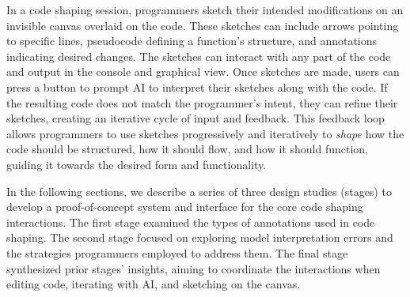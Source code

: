 In a code shaping session, programmers sketch their intended modifications on an invisible canvas overlaid on the code. These sketches can include arrows pointing to specific lines, pseudocode defining a function's structure, and annotations indicating desired changes. The sketches can interact with any part of the code and output in the console and graphical view.
Once sketches are made, users can press a button to prompt AI to interpret their sketches along with the code. 
If the resulting code does not match the programmer's intent, they can refine their sketches, creating an iterative cycle of input and feedback.
This feedback loop allows programmers to use sketches progressively and iteratively to \textit{shape} how the code should be structured, how it should flow, and how it should function, guiding it towards the desired form and functionality.

In the following sections, we describe a series of three design studies (stages) to develop a proof-of-concept system and interface for the core code shaping interactions.
The first stage examined the types of annotations used in code shaping. The second stage focused on exploring model interpretation errors and the strategies programmers employed to address them. The final stage synthesized prior stages' insights, aiming to coordinate the interactions when editing code, iterating with AI, and sketching on the canvas. 







